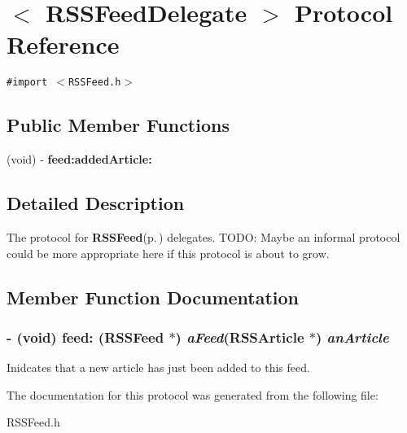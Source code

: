 \section{$<$ RSSFeed\-Delegate $>$ Protocol Reference}
\label{protocolRSSFeedDelegate-p}
{\tt \#import $<$RSSFeed.h$>$}

\subsection*{Public Member Functions}
\begin{CompactItemize}
\item 
(void) - {\bf feed:added\-Article:}
\end{CompactItemize}


\subsection{Detailed Description}
The protocol for {\bf RSSFeed}{\rm (p.\,\pageref{classRSSFeed})} delegates. TODO: Maybe an informal protocol could be more appropriate here if this protocol is about to grow. 



\subsection{Member Function Documentation}
\subsubsection{\setlength{\rightskip}{0pt plus 5cm}- (void) feed: ({\bf RSSFeed} $\ast$) {\em a\-Feed}({\bf RSSArticle} $\ast$) {\em an\-Article}}\label{protocolRSSFeedDelegate-p_f2d54324bc2e2806fd20ee23e274cbde}


Inidcates that a new article has just been added to this feed. 

The documentation for this protocol was generated from the following file:\begin{CompactItemize}
\item 
RSSFeed.h\end{CompactItemize}
